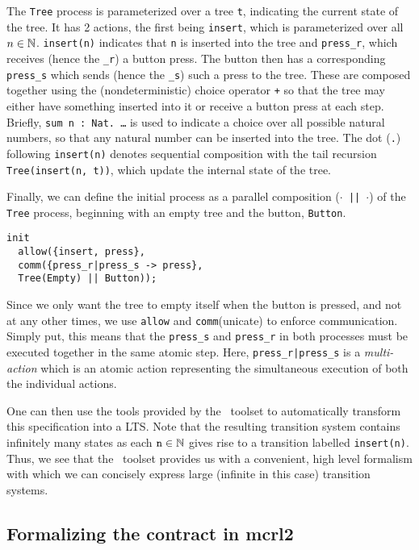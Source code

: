 \documentclass{article}
\begin{document}
The \texttt{Tree} process is parameterized over a tree \texttt{t}, indicating
the current state of the tree.
It has 2 actions, the first being \texttt{insert},  which is parameterized over
all $n \in \operatorname{\mathbb{N}}$.
\texttt{insert(n)} indicates that \texttt{n} is inserted into the
tree and \texttt{press\_r}, which receives (hence the \texttt{\_r}) a button
press.
The button then has a corresponding \texttt{press\_s} which sends
(hence the \texttt{\_s}) such a press to the tree.
These are composed together using the (nondeterministic) choice operator
\texttt{+} so that the
tree may either have something inserted into it or receive a button press at
each step.
Briefly, \texttt{sum n : Nat. \dots} is used to indicate a
choice over all possible natural numbers, so that any natural number can be
inserted into the tree.
The dot (\texttt{.}) following \texttt{insert(n)} denotes sequential composition
with the tail recursion \texttt{Tree(insert(n, t))}, which  update the internal
state of the tree.

Finally, we can define the initial process as a parallel composition
(\texttt{$\cdot$ || $\cdot$}) of the \texttt{Tree} process, beginning with an
empty tree and the button, \texttt{Button}.

\begin{lstlisting}
init
  allow({insert, press},
  comm({press_r|press_s -> press},
  Tree(Empty) || Button));
\end{lstlisting}

Since we only want the tree to empty itself when the button is pressed, and
not at any other times, we use \texttt{allow} and \texttt{comm}(unicate) to
enforce communication.
Simply put, this means that the \texttt{press\_s} and \texttt{press\_r} in both
processes must be executed together in the same atomic step.
Here, \texttt{press\_r|press\_s} is a \textit{multi-action} which is an atomic
action representing the simultaneous execution of both the individual actions.

One can then use the tools provided by the \mcrl \, toolset to automatically
transform this specification into a LTS.
Note that the resulting transition system contains infinitely many states as
each $\mathtt{n} \in \operatorname{\mathbb{N}}$ gives rise to a transition labelled \texttt{insert(n)}.
Thus, we see that the \mcrl \, toolset provides us with a convenient, high level
formalism with which we can concisely express large (infinite in this case)
transition systems.

\subsection{Formalizing the contract in mcrl2}
\end{document}
